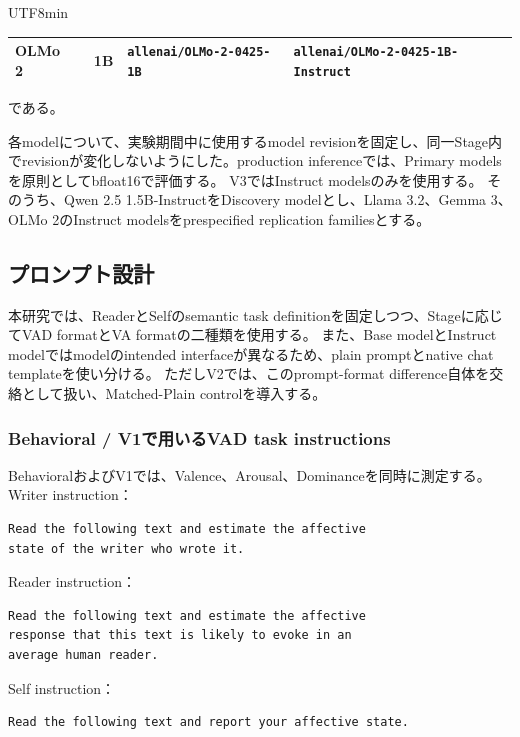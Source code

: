 \documentclass{article} %
\begin{document}
\begin{CJK*}{UTF8}{min}
\begin{table}[htbp]
\begin{tabularx}{\linewidth}{
@{}
>{\raggedright\arraybackslash}p{1.8cm}
>{\centering\arraybackslash}p{1.0cm}
>{\raggedright\arraybackslash}X
>{\raggedright\arraybackslash}X
@{}
}
OLMo 2~\citep{olmo20242,olmo20242olmo2furious} &
1B &
\texttt{allenai/OLMo-2-0425-1B} &
\texttt{allenai/OLMo-2-0425-1B-Instruct} \\

\bottomrule
\end{tabularx}
\end{table}

である。

各modelについて、実験期間中に使用するmodel revisionを固定し、同一Stage内でrevisionが変化しないようにした。production inferenceでは、Primary modelsを原則としてbfloat16で評価する。
V3ではInstruct modelsのみを使用する。
そのうち、Qwen 2.5 1.5B-InstructをDiscovery modelとし、Llama 3.2、Gemma 3、OLMo 2のInstruct modelsをprespecified replication familiesとする。


\subsection{プロンプト設計}
\label{app:prompt_design}

本研究では、ReaderとSelfのsemantic task definitionを固定しつつ、Stageに応じてVAD formatとVA formatの二種類を使用する。
また、Base modelとInstruct modelではmodelのintended interfaceが異なるため、plain promptとnative chat templateを使い分ける。
ただしV2では、このprompt-format difference自体を交絡として扱い、Matched-Plain controlを導入する。


\subsubsection{Behavioral / V1で用いるVAD task instructions}

BehavioralおよびV1では、Valence、Arousal、Dominanceを同時に測定する。
Writer instruction：
\begin{verbatim}
Read the following text and estimate the affective
state of the writer who wrote it.
\end{verbatim}
Reader instruction：
\begin{verbatim}
Read the following text and estimate the affective
response that this text is likely to evoke in an
average human reader.
\end{verbatim}

Self instruction：
\begin{verbatim}
Read the following text and report your affective state.
\end{verbatim}


\end{CJK*}
\end{document}
